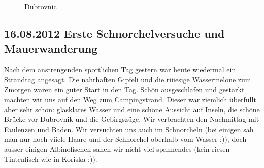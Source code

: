 \begin{figure}[H]
   \centering
   \quad
   \quad
   \quad
   \caption[Dubrovnic]{Dubrovnic}
\end{figure}

\subsection{16.08.2012 Erste Schnorchelversuche und Mauerwanderung}
Nach dem anstrengenden sportlichen Tag gestern war heute wiedermal ein Strandtag angesagt.
Die nahrhaften Gipfeli und die riiiesige Wassermelone zum Zmorgen waren ein guter Start in den Tag.
Schön ausgeschlafen und gestärkt machten wir uns auf den Weg zum Campingstrand.
Dieser war ziemlich überfüllt aber sehr schön: glasklares Wasser und eine schöne Aussicht auf Inseln, die schöne Brücke vor Dubrovnik und die Gebirgszüge.
Wir verbrachten den Nachmittag mit Faulenzen und Baden.
Wir versuchten uns auch im Schnorcheln (bei einigen sah man nur noch viiele Haare und der Schnorchel oberhalb vom Wasser ;)), doch ausser einigen Albinofischen sahen wir nicht viel spannendes (kein riesen Tintenfisch wie in Koriska :)).

